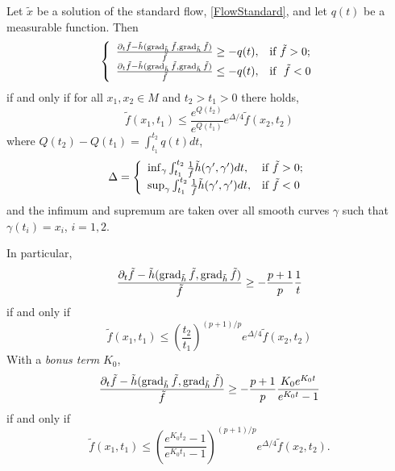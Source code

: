 \begin{thm}
\label{thm:moser_liyauhamilton}

Let $\tilde{x}$ be a solution of the standard flow, \eqref{FlowStandard}, and let $q(t)$ be a measurable function. Then
\begin{equation}
\label{eq:liyauhamilton_harnack}
\left\{
  \begin{array}{ll}
    \frac{\partial_t\tilde{f} - \tilde{h}(\operatorname{grad}_{\tilde{h}} \tilde{f}, \operatorname{grad}_{\tilde{h}} \tilde{f})}{\tilde{f}} \geq -q(t), & \hbox{if}~\tilde{f}>0; \\
    \frac{\partial_t\tilde{f} - \tilde{h}(\operatorname{grad}_{\tilde{h}} \tilde{f}, \operatorname{grad}_{\tilde{h}} \tilde{f})}{\tilde{f}} \leq -q(t), & \hbox{if}~~\tilde{f}<0
  \end{array}
\right.
\end{equation}
if and only if for all $x_1, x_2 \in M$ and $t_2 > t_1 > 0$ there holds,
\begin{equation}
\label{eq:moser_harnack}
\tilde{f} (x_1, t_1) \leq \frac{e^{Q(t_2)}}{e^{Q(t_1)}} e^{\Delta/4} \tilde{f} (x_2, t_2)
\end{equation}
where $Q(t_2) - Q(t_1) = \int_{t_1}^{t_2} q(t) dt$,
\[
\Delta = \left\{
           \begin{array}{ll}
             \inf_{\gamma} \int_{t_1}^{t_2} \frac{1}{\tilde{f}} \tilde{h}(\gamma', \gamma') dt, & \hbox{if}~ \tilde{f}>0; \\
             \sup_{\gamma} \int_{t_1}^{t_2} \frac{1}{\tilde{f}} \tilde{h}(\gamma', \gamma') dt, & \hbox{if}~ \tilde{f}<0
           \end{array}
         \right.
\]
and the infimum and supremum are taken over all smooth curves $\gamma$ such that $\gamma(t_i) = x_i$, $i = 1,2$.

In particular,
\[
\frac{\partial_t\tilde{f} - \tilde{h}(\operatorname{grad}_{\tilde{h}} \tilde{f}, \operatorname{grad}_{\tilde{h}} \tilde{f})}{\tilde{f}} \geq - \frac{p+1}{p} \frac{1}{t}
\]
if and only if
\[
\tilde{f} (x_1, t_1) \leq \left(\frac{t_2}{t_1}\right)^{(p+1)/p} e^{\Delta/4} \tilde{f} (x_2, t_2)
\]
With a \emph{bonus term} $K_0$,
\[
\frac{\partial_t\tilde{f} - \tilde{h}(\operatorname{grad}_{\tilde{h}} \tilde{f}, \operatorname{grad}_{\tilde{h}} \tilde{f})}{\tilde{f}} \geq - \frac{p+1}{p} \frac{K_0 e^{K_0 t}}{e^{K_0 t} - 1}
\]
if and only if
\[
\tilde{f} (x_1, t_1) \leq \left(\frac{e^{K_0 t_2} - 1}{e^{K_0 t_1} - 1}\right)^{(p+1)/p} e^{\Delta/4} \tilde{f} (x_2, t_2).
\]
\end{thm}

